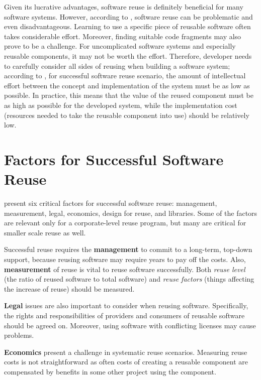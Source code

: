 Given its lucrative advantages, software reuse is definitely beneficial for many software systems. However, according to \citet{krueger_software_1992}, software reuse can be problematic and even disadvantageous. Learning to use a specific piece of reusable software often takes considerable effort. Moreover, finding suitable code fragments may also prove to be a challenge. For uncomplicated software systems and especially reusable components, it may not be worth the effort. Therefore, developer needs to carefully consider all sides of reusing when building a software system; according to \citet[chap.~1.3]{krueger_software_1992}, for successful software reuse scenario, the amount of intellectual effort between the concept and implementation of the system must be as low as possible. In practice, this means that the value of the reused component must be as high as possible for the developed system, while the implementation cost (resources needed to take the reusable component into use) should be relatively low. 

\section{Factors for Successful Software Reuse}
\label{section:successfullreusefactors}
\citet{frakes_success_1994} present six critical factors for successful software reuse: management, measurement, legal, economics, design for reuse, and libraries. Some of the factors are relevant only for a corporate-level reuse program, but many are critical for smaller scale reuse as well.

Successful reuse requires the \textbf{management} to commit to a long-term, top-down support, because reusing software may require years to pay off the costs. Also, \textbf{measurement} of reuse is vital to reuse software successfully. Both \emph{reuse level} (the ratio of reused software to total software) and \emph{reuse factors} (things affecting the increase of reuse) should be measured.

\textbf{Legal} issues are also important to consider when reusing software. Specifically, the rights and responsibilities of providers and consumers of reusable software should be agreed on. Moreover, using software with conflicting licenses may cause problems.

\textbf{Economics} present a challenge in systematic reuse scenarios. Measuring reuse costs is not straightforward as often costs of creating a reusable component are compensated by benefits in some other project using the component.

